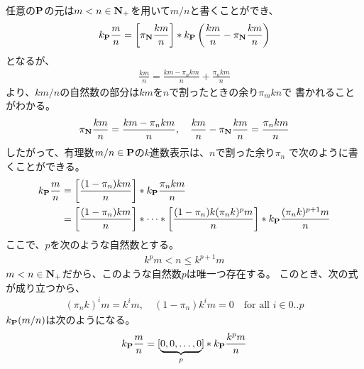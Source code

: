 	任意の${{\mathbf{P}}}$の元は$m<n\in\mathbf{N}_+$を用いて$m/n$と書くことができ、
	\begin{equation*}\begin{split}
		k_{{\mathbf{P}}}\frac{m}{n} = \left[\pi_{\mathbf{N}}\frac{km}{n}\right]
		* k_{{\mathbf{P}}}\left(\frac{km}{n}-\pi_{\mathbf{N}}\frac{km}{n}\right)
	\end{split}\end{equation*}
	となるが、
	\begin{equation*}\begin{split}
		\frac{km}{n} = \frac{km - \pi_nkm}{n} + \frac{\pi_nkm}{n}
	\end{split}\end{equation*}
	より、$km/n$の自然数の部分は$km$を$n$で割ったときの余り$\pi_mkn$で
	書かれることがわかる。
	\begin{equation*}\begin{split}
		\pi_{\mathbf{N}}\frac{km}{n} = \frac{km - \pi_nkm}{n}
		,\quad \frac{km}{n}-\pi_{\mathbf{N}}\frac{km}{n} = \frac{\pi_nkm}{n}
	\end{split}\end{equation*}
	したがって、有理数$m/n\in{{\ensuremath{\mathbf{P}}}}$の$k$進数表示は、$n$で割った余り$\pi_n$
	で次のように書くことができる。
	\begin{equation*}\begin{split}
		k_{{\mathbf{P}}}\frac{m}{n} 
		&= \left[\frac{(1-\pi_n)km}{n}\right] * k_{{\mathbf{P}}}\frac{\pi_nkm}{n} \\
		&= \left[\frac{(1-\pi_n)km}{n}\right] 
		* \cdots * \left[\frac{(1-\pi_n)k(\pi_nk)^pm}{n}\right] 
		* k_{{\mathbf{P}}}\frac{(\pi_nk)^{p+1}m}{n} \\
	\end{split}\end{equation*}
	ここで、$p$を次のような自然数とする。
	\begin{equation*}\begin{split}
		k^pm < n \le k^{p+1}m
	\end{split}\end{equation*}
	$m<n\in\mathbf{N}_+$だから、このような自然数$p$は唯一つ存在する。
	このとき、次の式が成り立つから、
	\begin{equation*}\begin{split}
		(\pi_nk)^im = k^im,\quad (1-\pi_n)k^im = 0 \quad\text{for all }i\in0..p
	\end{split}\end{equation*}
	$k_{{\mathbf{P}}}(m/n)$は次のようになる。
	\begin{equation*}\begin{split}
		k_{{\mathbf{P}}}\frac{m}{n} 
		&= [\underbrace{0,0,\dots,0}_{p}] 
		* k_{{\mathbf{P}}}\frac{k^pm}{n} \\
	\end{split}\end{equation*}
